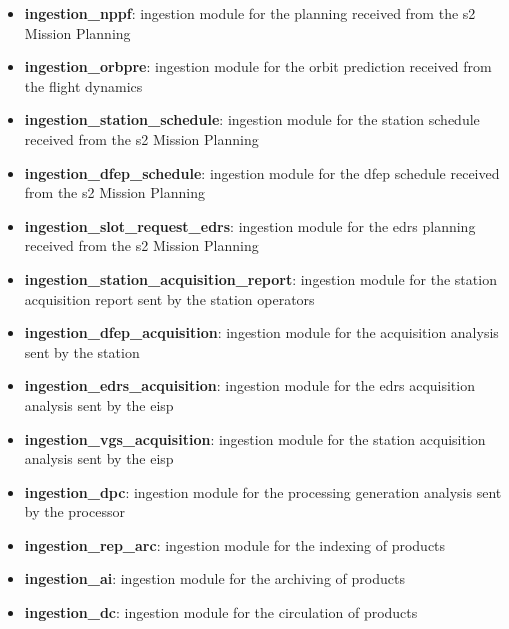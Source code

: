 \begin{itemize} 

\item \textbf{ingestion\_nppf}: ingestion module for the planning received from the \acrshort{s2} Mission Planning

\item \textbf{ingestion\_orbpre}: ingestion module for the orbit prediction received from the flight dynamics

\item \textbf{ingestion\_station\_schedule}: ingestion module for the station schedule received from the \acrshort{s2} Mission Planning

\item \textbf{ingestion\_dfep\_schedule}: ingestion module for the \acrshort{dfep} schedule received from the \acrshort{s2} Mission Planning

\item \textbf{ingestion\_slot\_request\_edrs}: ingestion module for the \acrshort{edrs} planning received from the \acrshort{s2} Mission Planning

\item \textbf{ingestion\_station\_acquisition\_report}: ingestion module for the station acquisition report sent by the station operators

\item \textbf{ingestion\_dfep\_acquisition}: ingestion module for the acquisition analysis sent by the station

\item \textbf{ingestion\_edrs\_acquisition}: ingestion module for the \acrshort{edrs} acquisition analysis sent by the \acrshort{eisp}

\item \textbf{ingestion\_vgs\_acquisition}: ingestion module for the station acquisition analysis sent by the \acrshort{eisp}

\item \textbf{ingestion\_dpc}: ingestion module for the processing generation analysis sent by the processor

\item \textbf{ingestion\_rep\_arc}: ingestion module for the indexing of products

\item \textbf{ingestion\_ai}: ingestion module for the archiving of products

\item \textbf{ingestion\_dc}: ingestion module for the circulation of products


\end{itemize}
